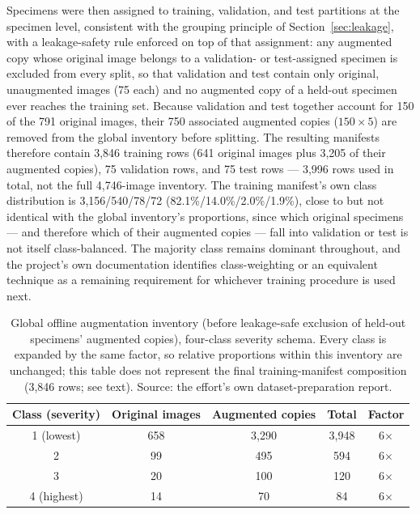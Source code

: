 Specimens were then assigned to training, validation, and test partitions
at the specimen level, consistent with the grouping principle of
Section~\ref{sec:leakage}, with a leakage-safety rule enforced on top of
that assignment: any augmented copy whose original image belongs to a
validation- or test-assigned specimen is excluded from every split, so
that validation and test contain only original, unaugmented images (75
each) and no augmented copy of a held-out specimen ever reaches the
training set. Because validation and test together account for 150 of the
791 original images, their 750 associated augmented copies ($150\times5$)
are removed from the global inventory before splitting. The resulting
manifests therefore contain 3{,}846 training rows (641 original images plus
3{,}205 of their augmented copies), 75 validation rows, and 75 test
rows — 3{,}996 rows used in total, not the full 4{,}746-image inventory.
The training manifest's own class distribution is 3{,}156/540/78/72
(82.1\%/14.0\%/2.0\%/1.9\%), close to but not identical with the global
inventory's proportions, since which original specimens — and therefore
which of their augmented copies — fall into validation or test is not
itself class-balanced. The majority class remains dominant throughout, and
the project's own documentation identifies class-weighting or an
equivalent technique as a remaining requirement for whichever training
procedure is used next.

\begin{table}[htbp]
\centering
\caption{Global offline augmentation inventory (before leakage-safe
exclusion of held-out specimens' augmented copies), four-class severity
schema. Every class is expanded by the same factor, so relative
proportions within this inventory are unchanged; this table does not
represent the final training-manifest composition (3{,}846 rows; see text).
Source: the effort's own dataset-preparation report.}
\label{tab:phase5-classdist}
\begin{tabular}{ccccc}
\toprule
Class (severity) & Original images & Augmented copies & Total & Factor \\
\midrule
1 (lowest) & 658 & 3{,}290 & 3{,}948 & 6$\times$ \\
2 & 99 & 495 & 594 & 6$\times$ \\
3 & 20 & 100 & 120 & 6$\times$ \\
4 (highest) & 14 & 70 & 84 & 6$\times$ \\
\bottomrule
\end{tabular}
\end{table}

